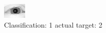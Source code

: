 \begin{figure}[h!]
\begin{center}
\includegraphics[width=0.60\columnwidth]{figures/ID3086_class_1_target_2.png}
\end{center}
\caption{ Classification: 1 actual target: 2}
\label{fig:ID3086_class_1_target_2}
\end{figure}
